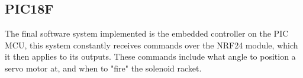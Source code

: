 \subsection{PIC18F}
The final software system implemented is the embedded controller on the PIC MCU, this system constantly receives commands over the NRF24 module, which it then applies to its outputs. These commands include what angle to position a servo motor at, and when to "fire" the solenoid racket.


